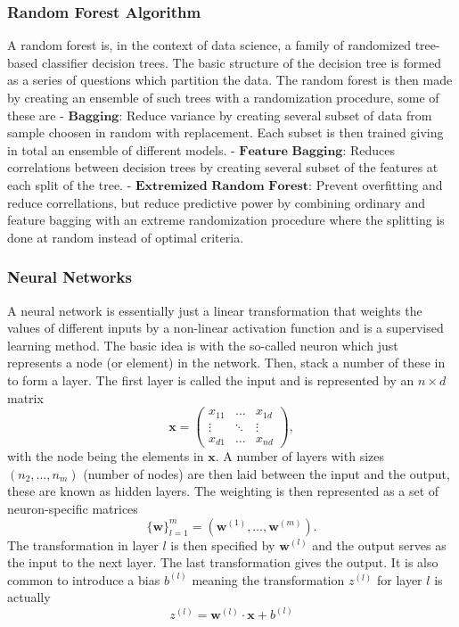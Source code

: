 \documentclass[10pt, t]{beamer}
\begin{document}
\hypertarget{random-forest-algorithm}{%
\subsubsection{Random Forest Algorithm}\label{random-forest-algorithm}}

A random forest is, in the context of data science, a family of
randomized tree-based classifier decision trees. The basic structure of
the decision tree is formed as a series of questions which partition the
data. The random forest is then made by creating an ensemble of such
trees with a randomization procedure, some of these are -
\(\textbf{Bagging}\): Reduce variance by creating several subset of data
from sample choosen in random with replacement. Each subset is then
trained giving in total an ensemble of different models. -
\(\textbf{Feature Bagging}\): Reduces correlations between decision
trees by creating several subset of the features at each split of the
tree. - \(\textbf{Extremized Random Forest}\): Prevent overfitting and
reduce correllations, but reduce predictive power by combining ordinary
and feature bagging with an extreme randomization procedure where the
splitting is done at random instead of optimal criteria.

\hypertarget{neural-networks}{%
\subsubsection{Neural Networks}\label{neural-networks}}

A neural network is essentially just a linear transformation that
weights the values of different inputs by a non-linear activation
function and is a supervised learning method. The basic idea is with the
so-called neuron which just represents a node (or element) in the
network. Then, stack a number of these in to form a layer. The first
layer is called the input and is represented by an \(n\times d\) matrix
\[\boldsymbol{x} = 
        \begin{pmatrix}
            x_{11} & \dots & x_{1d} \\
            \vdots & \ddots & \vdots \\
            x_{d1} & \dots & x_{nd}
        \end{pmatrix},\] with the node being the elements in
\(\boldsymbol{x}\). A number of layers with sizes \((n_2,\dots,n_m)\)
(number of nodes) are then laid between the input and the output, these
are known as hidden layers. The weighting is then represented as a set
of neuron-specific matrices
\[\{\boldsymbol{w}\}^m_{l=1} = \left(\boldsymbol{w}^{(1)},\dots,\boldsymbol{w}^{(m)}\right).\]
The transformation in layer \(l\) is then specified by
\(\boldsymbol{w}^{(l)}\) and the output serves as the input to the next
layer. The last transformation gives the output. It is also common to
introduce a bias \(b^{(l)}\) meaning the transformation \(z^{(l)}\) for
layer \(l\) is actually
\[z^{(l)} = \boldsymbol{w}^{(l)}\cdot \boldsymbol{x} + b^{(l)}\]
\end{document}

